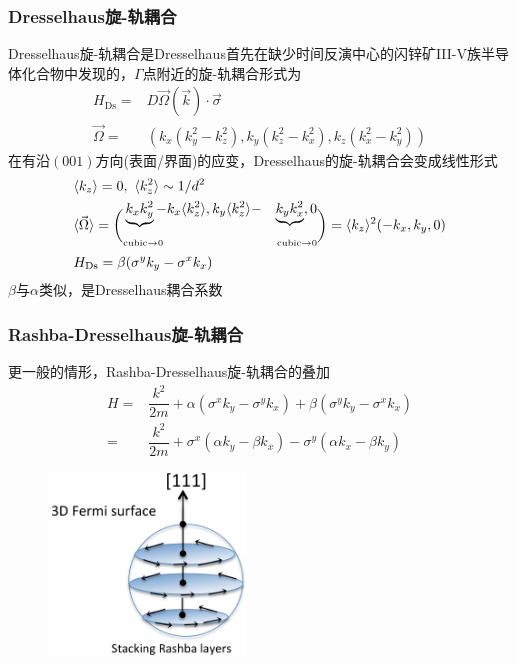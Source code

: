 \frame
{
	\frametitle{\textrm{Dresselhaus}旋-轨耦合}
	\textrm{Dresselhaus}旋-轨耦合是\textrm{Dresselhaus}首先在缺少时间反演中心的闪锌矿\textrm{III-V}族半导体化合物中发现的，$\Gamma$点附近的旋-轨耦合形式为
	\begin{displaymath}
		\begin{aligned}
			H_{\mathrm{Ds}}=&D\vec{\Omega}(\vec k)\cdot\vec{\sigma}\\
			\vec{\Omega}=&(k_x(k_y^2-k_z^2),k_y(k_z^2-k_x^2),k_z(k_x^2-k_y^2))
		\end{aligned}
	\end{displaymath}
	在有沿$(001)$方向(表面/界面)的应变，\textrm{Dresselhaus}的旋-轨耦合会变成线性形式
	\begin{displaymath}
		\begin{aligned}
			&\langle k_z\rangle=0,~\langle k_z^2\rangle\sim1/d^2\\
			&\langle\vec\Omega\rangle=\bigg(
				\begin{aligned}
				&\underbrace{k_xk_y^2}-k_x\langle k_z^2\rangle,k_y\langle k_z^2\rangle-&\underbrace{k_yk_x^2},0\\
				&{\mbox{\fontsize{6.2pt}{2.2pt}\selectfont{\textrm{cubic}$\rightarrow$0}}} &{\mbox{\fontsize{6.2pt}{2.2pt}\selectfont{\textrm{cubic}$\rightarrow$0}}}
			\end{aligned}
			\bigg)
				=\langle k_z\rangle^2(-k_x,k_y,0)\\
			&H_{\mathrm{Ds}}=\beta(\sigma^yk_y-\sigma^xk_x)
		\end{aligned}
	\end{displaymath}
$\beta$与$\alpha$类似，是\textrm{Dresselhaus}耦合系数 
}

\frame
{
	\frametitle{\textrm{Rashba-Dresselhaus}旋-轨耦合}
	更一般的情形，\textrm{Rashba-Dresselhaus}旋-轨耦合的叠加
	\begin{displaymath}
		\begin{aligned}
			H=&\dfrac{k^2}{2m}+\alpha(\sigma^xk_y-\sigma^yk_x)+\beta(\sigma^yk_y-\sigma^xk_x)\\
			=&\dfrac{k^2}{2m}+\sigma^x(\alpha k_y-\beta k_x)-\sigma^y(\alpha k_x-\beta k_y)
		\end{aligned}
	\end{displaymath}
\begin{figure}[h!]
\centering
\vspace*{-0.10in}
\includegraphics[height=1.9in,width=2.10in,viewport=0 0 850 810,clip]{Figures/SOC_Rashba-Dresselhaus-1.png}
\label{Rashba_Dresselhaus}
\end{figure}
}

